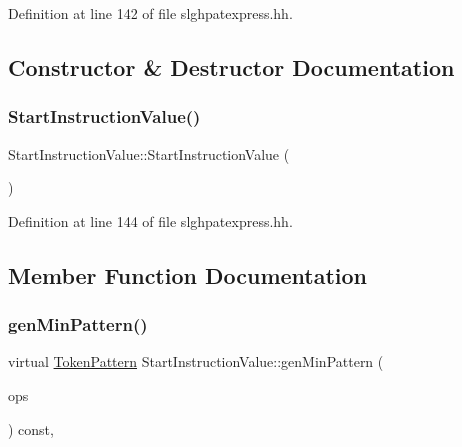Definition at line 142 of file slghpatexpress.\+hh.



\subsection{Constructor \& Destructor Documentation}
\mbox{\label{class_start_instruction_value_a664ffdbfc8c447d445d24350a67a02b3}} 
\subsubsection{\texorpdfstring{StartInstructionValue()}{StartInstructionValue()}}
{\footnotesize\ttfamily Start\+Instruction\+Value\+::\+Start\+Instruction\+Value (\begin{DoxyParamCaption}\item[{void}]{ }\end{DoxyParamCaption})\hspace{0.3cm}{\ttfamily [inline]}}



Definition at line 144 of file slghpatexpress.\+hh.



\subsection{Member Function Documentation}
\mbox{\label{class_start_instruction_value_afb0f9fba5d65119bdd04e4507630f77f}} 
\subsubsection{\texorpdfstring{genMinPattern()}{genMinPattern()}}
{\footnotesize\ttfamily virtual \mbox{\hyperlink{class_token_pattern}{Token\+Pattern}} Start\+Instruction\+Value\+::gen\+Min\+Pattern (\begin{DoxyParamCaption}\item[{const vector$<$ \mbox{\hyperlink{class_token_pattern}{Token\+Pattern}} $>$ \&}]{ops }\end{DoxyParamCaption}) const\hspace{0.3cm}{\ttfamily [inline]}, {\ttfamily [virtual]}}



